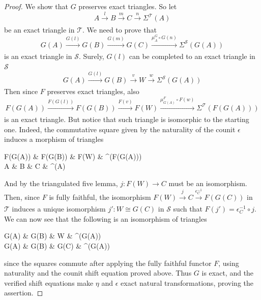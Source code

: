 \documentclass[11pt,reqno,a4paper]{amsart}
\theoremstyle{definition}
\theoremstyle{remark}
\newcommand{\T}{\mathcal{T}}
\renewcommand{\S}{\mathcal{S}}
\newcommand{\0}{\mathbf{0}}
\renewcommand{\1}{\mathbf{1}}
\def\:{\colon}
\def\c{\circ}
\newcommand{\iso}{\cong}
\newcommand{\aar}[2][]{\xrightarrow[#1]{#2}}
\begin{document}
\begin{proof}
    We show that $G$ preserves exact triangles. So let
    $$A\aar{l}B\aar{m}C\aar{n}\Sigma^{\T}(A)$$ be an exact triangle in $\T$. We need to prove that
    $$G(A)\aar{G(l)}G(B)\aar{G(m)}G(C)\aar{\mu^G_A\c G(n)}\Sigma^{\S}(G(A))$$
    is an exact triangle in $\S$. Surely, $G(l)$ can be completed to an exact triangle in $\S$
    $$G(A)\aar{G(l)}G(B)\aar{v}W\aar{w}\Sigma^{\S}(G(A))$$
    Then since $F$ preserves exact triangles, also
    $$F(G(A))\aar{F(G(l))}F(G(B))\aar{F(v)}F(W)\aar{\mu^F_{G(A)}\c F(w)}\Sigma^{\T}(F(G(A)))$$
    is an exact triangle. But notice that such triangle is isomorphic to the starting one. Indeed, the commutative square
    given by the naturality of the counit $\epsilon$ induces a morphism of triangles
    \begin{cd}[4]
        {F(G(A))} \& {F(G(B))} \& {F(W)} \& {\Sigma^{\T}(F(G(A)))} \\
	A \& B \& C \& {\Sigma^{\T}(A)}
	\arrow["{F(G(l))}", from=1-1, to=1-2]
	\arrow["{\epsilon_A}"',aiso, from=1-1, to=2-1]
	\arrow["{F(v)}", from=1-2, to=1-3]
	\arrow["{\epsilon_B}"',aiso, from=1-2, to=2-2]
	\arrow["{\mu^F_{G(A)}\c F(w)}", from=1-3, to=1-4]
	\arrow["j", dashed, from=1-3, to=2-3]
	\arrow["{\Sigma^{\T}(\epsilon_A)}", from=1-4, to=2-4]
	\arrow["l"', from=2-1, to=2-2]
	\arrow["m"', from=2-2, to=2-3]
	\arrow["n"', from=2-3, to=2-4]
    \end{cd}

    And by the triangulated five lemma, $j\:F(W)\to C$ must be an isomorphism. Then, since $F$ is fully faithful, the isomorphism $F(W)\aar{j}C\aar{\epsilon_C^{-1}}F(G(C))$ in $\T$ induces a unique isomorphism $j'\:W\iso G(C)$ in $\S$ such that $F(j')=\epsilon_C^{-1}\c j$. We can now see that the following is an isomorphism of triangles
    \begin{cd}[4]
    {G(A)} \& {G(B)} \& W \& {\Sigma^{\S}(G(A))} \\
	{G(A)} \& {G(B)} \& {G(C)} \& {\Sigma^{\S}(G(A))}
	\arrow["{G(l)}", from=1-1, to=1-2]
	\arrow[equals, from=1-1, to=2-1]
	\arrow["v", from=1-2, to=1-3]
	\arrow[equals, from=1-2, to=2-2]
	\arrow["w", from=1-3, to=1-4]
	\arrow["j'", dashed, from=1-3, to=2-3]
	\arrow[equals, from=1-4, to=2-4]
	\arrow["{G(l)}"', from=2-1, to=2-2]
	\arrow["{G(m)}"', from=2-2, to=2-3]
	\arrow["{\mu^G_A\c G(n)}"', from=2-3, to=2-4]
    \end{cd}
    since the squares commute after applying the fully faithful functor $F$, using naturality and the counit shift equation proved above. Thus $G$ is exact, and the verified shift equations make $\eta$ and $\epsilon$ exact natural transformations, proving the assertion.
\end{proof}
\end{document}
